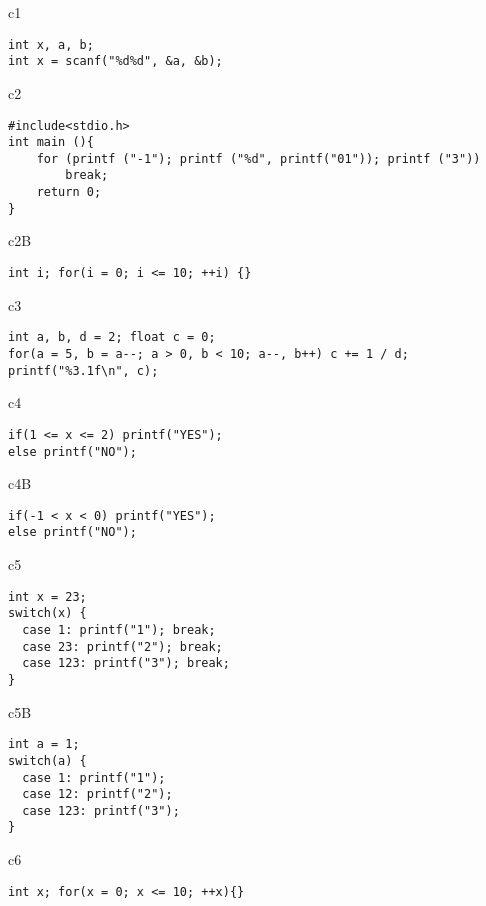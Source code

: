 \begin{chunk}{c1}
\begin{verbatim}
int x, a, b;
int x = scanf("%d%d", &a, &b);
\end{verbatim}
\end{chunk}

\begin{chunk}{c2}
\begin{verbatim}
#include<stdio.h>
int main (){
    for (printf ("-1"); printf ("%d", printf("01")); printf ("3")) 
        break;
    return 0;
}
\end{verbatim}
\end{chunk}

\begin{chunk}{c2B}
\begin{verbatim}
int i; for(i = 0; i <= 10; ++i) {} 
\end{verbatim}
\end{chunk}

\begin{chunk}{c3}
\begin{verbatim}
int a, b, d = 2; float c = 0;
for(a = 5, b = a--; a > 0, b < 10; a--, b++) c += 1 / d;
printf("%3.1f\n", c);
\end{verbatim}
\end{chunk}

\begin{chunk}{c4}
\begin{verbatim}
if(1 <= x <= 2) printf("YES");
else printf("NO");
\end{verbatim}
\end{chunk}

\begin{chunk}{c4B}
\begin{verbatim}
if(-1 < x < 0) printf("YES");
else printf("NO");
\end{verbatim}
\end{chunk}


\begin{chunk}{c5}
\begin{verbatim}
int x = 23;
switch(x) {
  case 1: printf("1"); break;
  case 23: printf("2"); break;
  case 123: printf("3"); break;
}
\end{verbatim}
\end{chunk}

\begin{chunk}{c5B}
\begin{verbatim}
int a = 1;
switch(a) {
  case 1: printf("1");
  case 12: printf("2");
  case 123: printf("3");
}
\end{verbatim}
\end{chunk}

\begin{chunk}{c6}
\begin{verbatim}
int x; for(x = 0; x <= 10; ++x){}
\end{verbatim}
\end{chunk}


